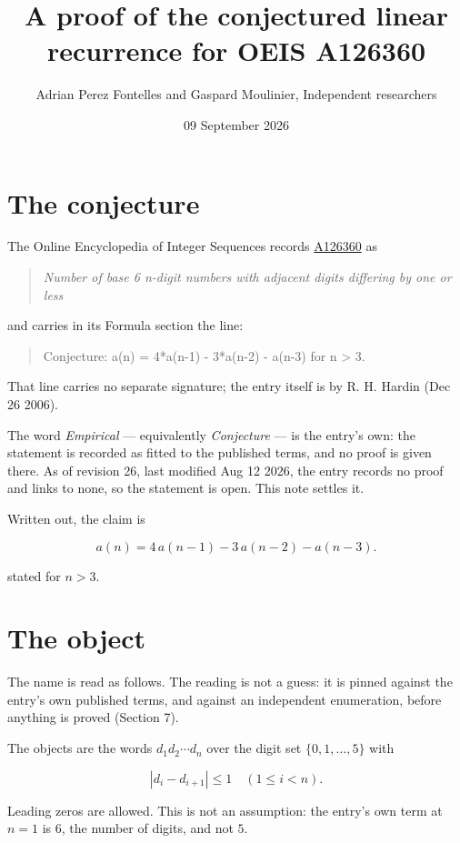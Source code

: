 \documentclass[11pt]{article}
\title{A proof of the conjectured linear recurrence for OEIS A126360}
\author{Adrian Perez Fontelles and Gaspard Moulinier, Independent researchers}
\date{09 September 2026}
\theoremstyle{definition}
\begin{document}
\maketitle
\section{The conjecture}

The Online Encyclopedia of Integer Sequences records \href{https://oeis.org/A126360}{A126360} as

\begin{quote}\itshape Number of base 6 n-digit numbers with adjacent digits differing by one or less\end{quote}

and carries in its Formula section the line:

\begin{quote}\ttfamily Conjecture: a(n) = 4*a(n-1) - 3*a(n-2) - a(n-3) for n > 3.\end{quote}

That line carries no separate signature; the entry itself is by R. H. Hardin (Dec 26 2006).

The word {\itshape Empirical} --- equivalently {\itshape Conjecture} --- is the entry's own: the statement is recorded as fitted to the published terms, and no proof is given there. As of revision 26, last modified Aug 12 2026, the entry records no proof and links to none, so the statement is open. This note settles it.

Written out, the claim is

\[a(n) = 4\,a(n-1) - 3\,a(n-2) - a(n-3).\]

stated for $n > 3$.

\section{The object}

The name is read as follows. The reading is not a guess: it is pinned against the entry's own published terms, and against an independent enumeration, before anything is proved (Section 7).

The objects are the words $d_1 d_2 \cdots d_n$ over the digit set $\{0,1,\dots,5\}$ with

\[|d_i - d_{i+1}| \le 1\quad (1 \le i < n).\]

Leading zeros are allowed. This is not an assumption: the entry's own term at $n=1$ is $6$, the number of digits, and not $5$.
\end{document}
